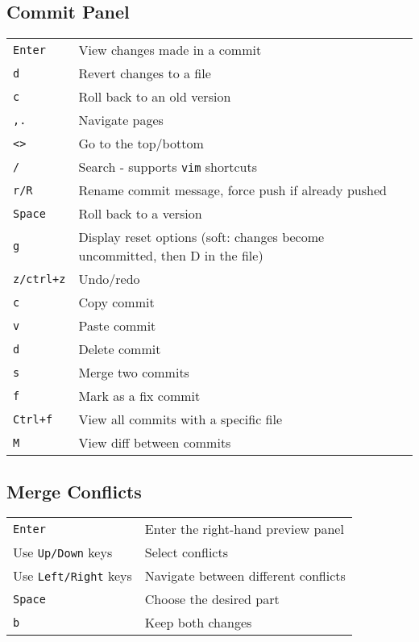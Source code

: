 \documentclass[a4paper]{article}
\renewcommand{\tt}{\texttt}
\begin{document}
\subsection{Commit Panel}
\begin{tabular}{p{6cm} p{8cm}}
    \tt{Enter} & View changes made in a commit \\
    \tt{d} & Revert changes to a file \\
    \tt{c} & Roll back to an old version \\
    \tt{,.} & Navigate pages \\
    \tt{<>} & Go to the top/bottom \\
    \tt{/} & Search - supports \tt{vim} shortcuts \\
    \tt{r/R} & Rename commit message, force push if already pushed \\
    \tt{Space} & Roll back to a version \\
    \tt{g} & Display reset options (soft: changes become uncommitted, then D in the file) \\
    \tt{z/ctrl+z} & Undo/redo \\
    \tt{c} & Copy commit \\
    \tt{v} & Paste commit \\
    \tt{d} & Delete commit \\
    \tt{s} & Merge two commits \\
    \tt{f} & Mark as a fix commit \\
    \tt{Ctrl+f} & View all commits with a specific file \\
    \tt{M} & View diff between commits \\
\end{tabular}
\subsection{Merge Conflicts}
\begin{tabular}{p{6cm} p{8cm}}
    \tt{Enter} & Enter the right-hand preview panel \\
    Use \tt{Up/Down} keys & Select conflicts \\
    Use \tt{Left/Right} keys & Navigate between different conflicts \\
    \tt{Space} & Choose the desired part \\
    \tt{b} & Keep both changes \\
\end{tabular}
\end{document}
